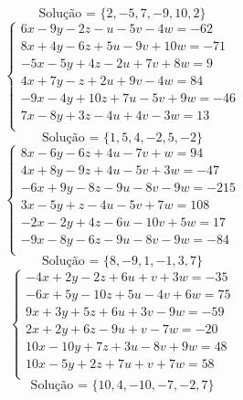 \documentclass[12pt,oneside,a4paper]{article}
\begin{document}
\begin{equation*}
\text{Solução = }\{2,-5,7,-9,10,2\}
\end{equation*}
\vspace{\baselineskip}
\begin{equation*}
\begin{cases}
6x-9y-2z-u-5v-4w=-62 \\
8x+4y-6z+5u-9v+10w=-71 \\
-5x-5y+4z-2u+7v+8w=9 \\
4x+7y-z+2u+9v-4w=84 \\
-9x-4y+10z+7u-5v+9w=-46 \\
7x-8y+3z-4u+4v-3w=13 \\
\end{cases}
\end{equation*}
\begin{equation*}
\text{Solução = }\{1,5,4,-2,5,-2\}
\end{equation*}
\vspace{\baselineskip}
\begin{equation*}
\begin{cases}
8x-6y-6z+4u-7v+w=94 \\
4x+8y-9z+4u-5v+3w=-47 \\
-6x+9y-8z-9u-8v-9w=-215 \\
3x-5y+z-4u-5v+7w=108 \\
-2x-2y+4z-6u-10v+5w=17 \\
-9x-8y-6z-9u-8v-9w=-84 \\
\end{cases}
\end{equation*}
\begin{equation*}
\text{Solução = }\{8,-9,1,-1,3,7\}
\end{equation*}
\vspace{\baselineskip}
\begin{equation*}
\begin{cases}
-4x+2y-2z+6u+v+3w=-35 \\
-6x+5y-10z+5u-4v+6w=75 \\
9x+3y+5z+6u+3v-9w=-59 \\
2x+2y+6z-9u+v-7w=-20 \\
10x-10y+7z+3u-8v+9w=48 \\
10x-5y+2z+7u+v+7w=58 \\
\end{cases}
\end{equation*}
\begin{equation*}
\text{Solução = }\{10,4,-10,-7,-2,7\}
\end{equation*}
\end{document}
